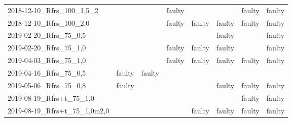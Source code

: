 \begin{tabular}{llllllp{2cm}p{2cm}}
2018-12-10\_Rfrs\_100\_1,5\_2 &           &               &       faulty &         &                   &                            faulty &                              faulty \\
2018-12-10\_Rfrs\_100\_2,0    &           &               &       faulty &  faulty &            faulty &                            faulty &                              faulty \\
2019-02-20\_Rfrs\_75\_0,5     &           &               &              &         &            faulty &                                   &                              faulty \\
2019-02-20\_Rfrs\_75\_1,0     &           &               &       faulty &  faulty &            faulty &                                   &                              faulty \\
2019-04-03\_Rfrs\_75\_1,0     &           &               &       faulty &  faulty &            faulty &                            faulty &                              faulty \\
2019-04-16\_Rfrs\_75\_0,5     &    faulty &        faulty &              &         &                   &                                   &                                     \\
2019-05-06\_Rfrs\_75\_0,8     &    faulty &               &              &         &            faulty &                            faulty &                              faulty \\
2019-08-19\_Rfrs+t\_75\_1,0      &           &               &              &         &                   &                            faulty &                              faulty \\
2019-08-19\_Rfrs+t\_75\_1,0m2,0  &           &               &              &  faulty &            faulty &                            faulty &                              faulty \\
\bottomrule
\end{tabular}
